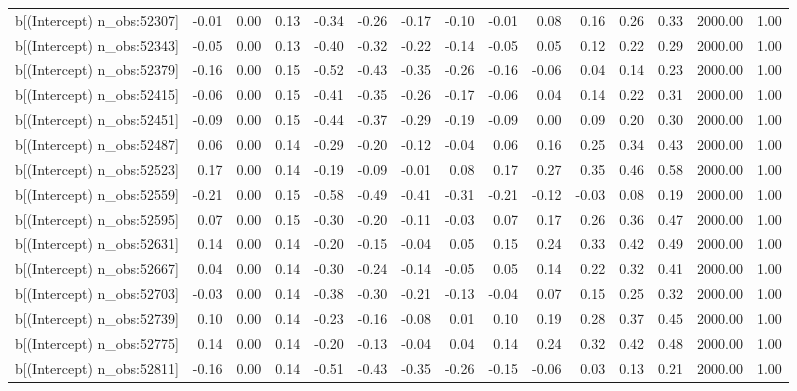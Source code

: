 \begin{table}[ht]
\begin{tabular}{rrrrrrrrrrrrrrr}
  b[(Intercept) n\_obs:52307] & -0.01 & 0.00 & 0.13 & -0.34 & -0.26 & -0.17 & -0.10 & -0.01 & 0.08 & 0.16 & 0.26 & 0.33 & 2000.00 & 1.00 \\ 
  b[(Intercept) n\_obs:52343] & -0.05 & 0.00 & 0.13 & -0.40 & -0.32 & -0.22 & -0.14 & -0.05 & 0.05 & 0.12 & 0.22 & 0.29 & 2000.00 & 1.00 \\ 
  b[(Intercept) n\_obs:52379] & -0.16 & 0.00 & 0.15 & -0.52 & -0.43 & -0.35 & -0.26 & -0.16 & -0.06 & 0.04 & 0.14 & 0.23 & 2000.00 & 1.00 \\ 
  b[(Intercept) n\_obs:52415] & -0.06 & 0.00 & 0.15 & -0.41 & -0.35 & -0.26 & -0.17 & -0.06 & 0.04 & 0.14 & 0.22 & 0.31 & 2000.00 & 1.00 \\ 
  b[(Intercept) n\_obs:52451] & -0.09 & 0.00 & 0.15 & -0.44 & -0.37 & -0.29 & -0.19 & -0.09 & 0.00 & 0.09 & 0.20 & 0.30 & 2000.00 & 1.00 \\ 
  b[(Intercept) n\_obs:52487] & 0.06 & 0.00 & 0.14 & -0.29 & -0.20 & -0.12 & -0.04 & 0.06 & 0.16 & 0.25 & 0.34 & 0.43 & 2000.00 & 1.00 \\ 
  b[(Intercept) n\_obs:52523] & 0.17 & 0.00 & 0.14 & -0.19 & -0.09 & -0.01 & 0.08 & 0.17 & 0.27 & 0.35 & 0.46 & 0.58 & 2000.00 & 1.00 \\ 
  b[(Intercept) n\_obs:52559] & -0.21 & 0.00 & 0.15 & -0.58 & -0.49 & -0.41 & -0.31 & -0.21 & -0.12 & -0.03 & 0.08 & 0.19 & 2000.00 & 1.00 \\ 
  b[(Intercept) n\_obs:52595] & 0.07 & 0.00 & 0.15 & -0.30 & -0.20 & -0.11 & -0.03 & 0.07 & 0.17 & 0.26 & 0.36 & 0.47 & 2000.00 & 1.00 \\ 
  b[(Intercept) n\_obs:52631] & 0.14 & 0.00 & 0.14 & -0.20 & -0.15 & -0.04 & 0.05 & 0.15 & 0.24 & 0.33 & 0.42 & 0.49 & 2000.00 & 1.00 \\ 
  b[(Intercept) n\_obs:52667] & 0.04 & 0.00 & 0.14 & -0.30 & -0.24 & -0.14 & -0.05 & 0.05 & 0.14 & 0.22 & 0.32 & 0.41 & 2000.00 & 1.00 \\ 
  b[(Intercept) n\_obs:52703] & -0.03 & 0.00 & 0.14 & -0.38 & -0.30 & -0.21 & -0.13 & -0.04 & 0.07 & 0.15 & 0.25 & 0.32 & 2000.00 & 1.00 \\ 
  b[(Intercept) n\_obs:52739] & 0.10 & 0.00 & 0.14 & -0.23 & -0.16 & -0.08 & 0.01 & 0.10 & 0.19 & 0.28 & 0.37 & 0.45 & 2000.00 & 1.00 \\ 
  b[(Intercept) n\_obs:52775] & 0.14 & 0.00 & 0.14 & -0.20 & -0.13 & -0.04 & 0.04 & 0.14 & 0.24 & 0.32 & 0.42 & 0.48 & 2000.00 & 1.00 \\ 
  b[(Intercept) n\_obs:52811] & -0.16 & 0.00 & 0.14 & -0.51 & -0.43 & -0.35 & -0.26 & -0.15 & -0.06 & 0.03 & 0.13 & 0.21 & 2000.00 & 1.00 \\ 

\end{tabular}
\end{table}
